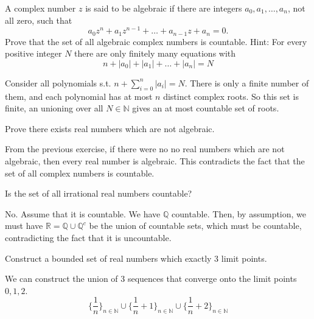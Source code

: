 \documentclass{article}
\begin{document}
    \begin{exercise}[Rudin 2.2]
    A complex number $z$ is said to be algebraic if there are integers $a_0, a_1, \ldots, a_n$, not all zero, such that
    \[
    a_0z^n + a_1z^{n-1} + \ldots + a_{n-1}z + a_n = 0.
    \]
    Prove that the set of all algebraic complex numbers is countable. Hint: For every positive integer $N$ there are only finitely many equations with 
    \[n + |a_0| + |a_1| + \ldots + |a_n| = N\]
    \end{exercise}
    \begin{solution}
    Consider all polynomials s.t. $n + \sum_{i=0}^n |a_i| = N$. There is only a finite number of them, and each polynomial has at most $n$ distinct complex roots. So this set is finite, an unioning over all $N \in \mathbb{N}$ gives an at most countable set of roots. 
    \end{solution}

    \begin{exercise}[Rudin 2.3]
    Prove there exists real numbers which are not algebraic. 
    \end{exercise}
    \begin{solution}
    From the previous exercise, if there were no no real numbers which are not algebraic, then every real number is algebraic. This contradicts the fact that the set of all complex numbers is countable. 
    \end{solution}

    \begin{exercise}[Rudin 2.4]
    Is the set of all irrational real numbers countable? 
    \end{exercise}
    \begin{solution}
    No. Assume that it is countable. We have $\mathbb{Q}$ countable. Then, by assumption, we must have $\mathbb{R} = \mathbb{Q} \cup \mathbb{Q}^c$ be the union of countable sets, which must be countable, contradicting the fact that it is uncountable. 
    \end{solution}

    \begin{exercise}[Rudin 2.5]
    Construct a bounded set of real numbers which exactly 3 limit points. 
    \end{exercise}
    \begin{solution}
    We can construct the union of 3 sequences that converge onto the limit points $0, 1, 2$. 
    \[\big\{ \frac{1}{n} \big\}_{n \in \mathbb{N}} \cup \big\{ \frac{1}{n} + 1\}_{n \in \mathbb{N}} \cup \big\{ \frac{1}{n} + 2 \big\}_{n \in \mathbb{N}}\]
    \end{solution}
\end{document}
